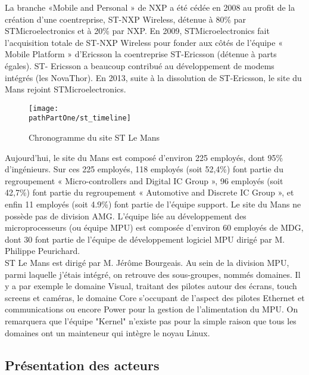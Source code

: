 La branche «Mobile and Personal » de NXP a été cédée en 2008 au profit de la
création d’une coentreprise, ST-NXP Wireless, détenue à 80\% par
STMicroelectronics et à 20\% par NXP.  En 2009, STMicroelectronics fait
l’acquisition totale de ST-NXP Wireless pour fonder aux côtés de l’équipe «
Mobile Platform » d’Ericsson la coentreprise ST-Ericsson (détenue à parts
égales). ST- Ericsson a beaucoup contribué au développement de modems intégrés
(les NovaThor). En 2013, suite à la dissolution de ST-Ericsson, le site du
Mans rejoint STMicroelectronics. \\

\begin{figure}[H]
	\begin{center}
		\texttt{[image: \\pathPartOne/st\_timeline]}
                \caption{Chronogramme du site ST Le Mans}
	    \label{fig:st_timeline}
	\end{center}
\end{figure}

Aujourd'hui, le site du Mans est composé d’environ 225 employés, dont 95\%
d’ingénieurs.  Sur ces 225 employés, 118 employés (soit 52,4\%) font partie du
regroupement « Micro-controllers and Digital IC Group », 96 employés (soit
42,7\%) font partie du regroupement « Automotive and Discrete IC Group », et
enfin 11 employés (soit 4.9\%) font partie de l’équipe support. Le site du
Mans ne possède pas de division AMG. L’équipe liée au développement des
microprocesseurs (ou équipe MPU) est composée d’environ 60 employés de MDG,
dont 30 font partie de l’équipe de développement logiciel MPU dirigé par M.
Philippe Peurichard. \\

ST Le Mans est dirigé par M. Jérôme Bourgeais. Au sein de la division MPU,
parmi laquelle j'étais intégré, on retrouve des sous-groupes, nommés domaines.
Il y a par exemple le domaine Visual, traitant des pilotes autour des écrans,
touch screens et caméras, le domaine Core s'occupant de l'aspect des pilotes
Ethernet et communications ou encore Power pour la gestion de l'alimentation
du MPU. On remarquera que l'équipe "Kernel" n'existe pas pour la simple raison
que tous les domaines ont un mainteneur qui intègre le noyau Linux. \\

\subsection{Présentation des acteurs}
\label{chp:part1:presentation_actors}

